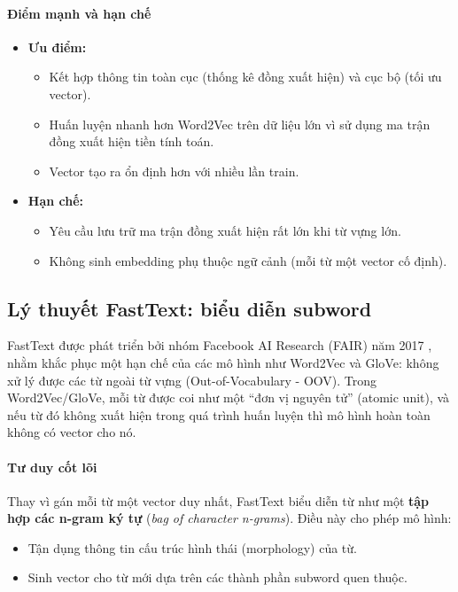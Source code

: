 \paragraph{Điểm mạnh và hạn chế}
\begin{itemize}
    \item \textbf{Ưu điểm:} 
    \begin{itemize}
        \item Kết hợp thông tin toàn cục (thống kê đồng xuất hiện) và cục bộ (tối ưu vector).
        \item Huấn luyện nhanh hơn Word2Vec trên dữ liệu lớn vì sử dụng ma trận đồng xuất hiện tiền tính toán.
        \item Vector tạo ra ổn định hơn với nhiều lần train.
    \end{itemize}
    \item \textbf{Hạn chế:}
    \begin{itemize}
        \item Yêu cầu lưu trữ ma trận đồng xuất hiện rất lớn khi từ vựng lớn.
        \item Không sinh embedding phụ thuộc ngữ cảnh (mỗi từ một vector cố định).
    \end{itemize}
\end{itemize}

\subsection{Lý thuyết FastText: biểu diễn subword}
\label{ssec:fasttext}

FastText được phát triển bởi nhóm Facebook AI Research (FAIR) năm 2017 \cite{bojanowski2017enriching}, nhằm khắc phục một hạn chế của các mô hình như Word2Vec và GloVe: không xử lý được các từ ngoài từ vựng (Out-of-Vocabulary - OOV).
Trong Word2Vec/GloVe, mỗi từ được coi như một “đơn vị nguyên tử” (atomic unit), và nếu từ đó không xuất hiện trong quá trình huấn luyện thì mô hình hoàn toàn không có vector cho nó.  

\paragraph{Tư duy cốt lõi}
Thay vì gán mỗi từ một vector duy nhất, FastText biểu diễn từ như một \textbf{tập hợp các n-gram ký tự} (\textit{bag of character n-grams}). Điều này cho phép mô hình:
\begin{itemize}
    \item Tận dụng thông tin cấu trúc hình thái (morphology) của từ.
    \item Sinh vector cho từ mới dựa trên các thành phần subword quen thuộc.
\end{itemize}


